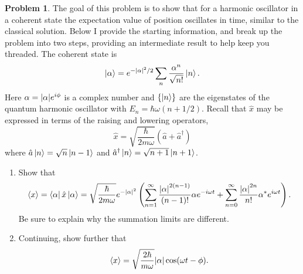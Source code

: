\documentclass[10pt]{article}
\theoremstyle{definition}
\newtheorem{problem}{Problem}
\begin{document}
\begin{problem}
The goal of this problem is to show that for a harmonic oscillator in a coherent state
the expectation value of position oscillates in time, similar to the classical solution. Below
I provide the starting information, and break up the problem into two steps, providing an
intermediate result to help keep you threaded.
The coherent state is
$$\ket{\alpha}=e^{-\abs{\alpha}^2/2}\sum_n\frac{\alpha^n}{\sqrt{n!}}\ket{n}.$$
Here $\alpha=\abs{\alpha}e^{i\phi}$ is a complex number and $\left\{\ket{n}\right\}$ are the eigenstates of the quantum harmonic oscillator with $E_n=\hbar\omega(n+1/2)$.
Recall that $\hat{x}$ may be expressed in terms of the raising and lowering operators,
$$\hat{x}=\sqrt{\frac{\hbar}{2m\omega}}\left(\hat{a}+\hat{a}^\dagger\right)$$
where $\hat{a}\ket{n}=\sqrt{n}\ket{n-1}$ and $\hat{a}^\dagger\ket{n}=\sqrt{n+1}\ket{n+1}$.
\begin{enumerate}[label=(\alph*)]
  \item Show that
        $$\expval{x}=\bra{\alpha}\hat{x}\ket{\alpha}=\sqrt{\frac{\hbar}{2m\omega}}e^{-\abs{\alpha}^2}\left(\sum_{n=1}^{\infty}\frac{\abs{\alpha}^{2(n-1)}}{(n-1)!}\alpha e^{-i\omega t}+\sum_{n=0}^{\infty}\frac{\abs{\alpha}^{2n}}{n!}\alpha^* e^{i\omega t}\right).$$
        Be sure to explain why the summation limits are different.
  \item Continuing, show further that
        $$\expval{x}=\sqrt{\frac{2\hbar}{m\omega}}\abs{\alpha}\cos(\omega t-\phi).$$
\end{enumerate}
\end{problem}
\end{document}
